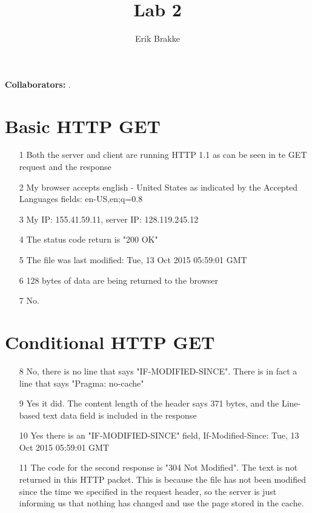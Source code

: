 \documentclass[11pt]{article}
\providecommand{\myparab}[1]{\smallskip\noindent\textbf{#1} }
\theoremstyle{definition}
\begin{document}
\title{Lab 2}
\author{Erik Brakke}
\maketitle

\thispagestyle{fancy}

\myparab{Collaborators: }  .
 
 
\section*{Basic HTTP GET}
\begin{enumerate}
	\item[1] Both the server and client are running HTTP 1.1 as can be seen in te GET request and the response

	\item[2] My browser accepts english - United States as indicated by the Accepted Languages fields: en-US,en;q=0.8

	\item[3] My IP: 155.41.59.11, server IP: 128.119.245.12\\

	\item[4] The status code return is "200 OK"\\

	\item[5] The file was last modified: Tue, 13 Oct 2015 05:59:01 GMT\\

	\item[6] 128 bytes of data are being returned to the browser\\

	\item[7] No.
\end{enumerate}

\section*{Conditional HTTP GET}
\begin{enumerate}
	\item[8] No, there is no line that says "IF-MODIFIED-SINCE".  There is in fact a line that says "Pragma: no-cache"\\

	\item[9] Yes it did.  The content length of the header says 371 bytes, and the Line-based text data field is included in the response\\

	\item[10] Yes there is an "IF-MODIFIED-SINCE" field, If-Modified-Since: Tue, 13 Oct 2015 05:59:01 GMT\\

	\item[11] The code for the second response is "304 Not Modified".  The text is not returned in this HTTP packet.  This is because the file has not been modified since the time we specified in the request header, so the server is just informing us that nothing has changed and use the page stored in the cache.  
\end{enumerate}
\end{document}
